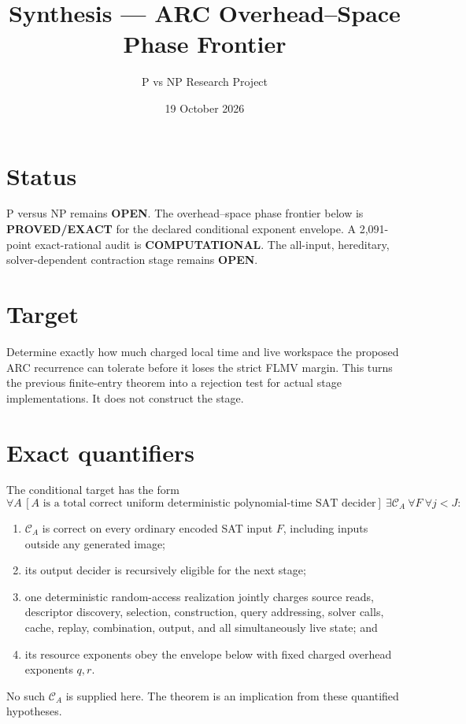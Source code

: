 \documentclass[11pt]{article}
\title{Synthesis --- ARC Overhead--Space Phase Frontier}
\author{P vs NP Research Project}
\date{19 October 2026}
\begin{document}
\maketitle

\section*{Status}
P versus NP remains \textbf{OPEN}.  The overhead--space phase frontier below
is \textbf{PROVED/EXACT} for the declared conditional exponent envelope.  A
2,091-point exact-rational audit is \textbf{COMPUTATIONAL}.  The all-input,
hereditary, solver-dependent contraction stage remains \textbf{OPEN}.

\section*{Target}
Determine exactly how much charged local time and live workspace the proposed
ARC recurrence can tolerate before it loses the strict FLMV margin.  This
turns the previous finite-entry theorem into a rejection test for actual
stage implementations.  It does not construct the stage.

\section*{Exact quantifiers}
The conditional target has the form
\[
\forall A\,[A\text{ is a total correct uniform deterministic polynomial-time
SAT decider}]
\ \exists \mathcal C_A
\ \forall F
\ \forall j< J:
\]
\begin{enumerate}[leftmargin=*]
  \item $\mathcal C_A$ is correct on every ordinary encoded SAT input $F$,
  including inputs outside any generated image;
  \item its output decider is recursively eligible for the next stage;
  \item one deterministic random-access realization jointly charges source
  reads, descriptor discovery, selection, construction, query addressing,
  solver calls, cache, replay, combination, output, and all simultaneously
  live state; and
  \item its resource exponents obey the envelope below with fixed charged
  overhead exponents $q,r$.
\end{enumerate}
No such $\mathcal C_A$ is supplied here.  The theorem is an implication from
these quantified hypotheses.
\end{document}
